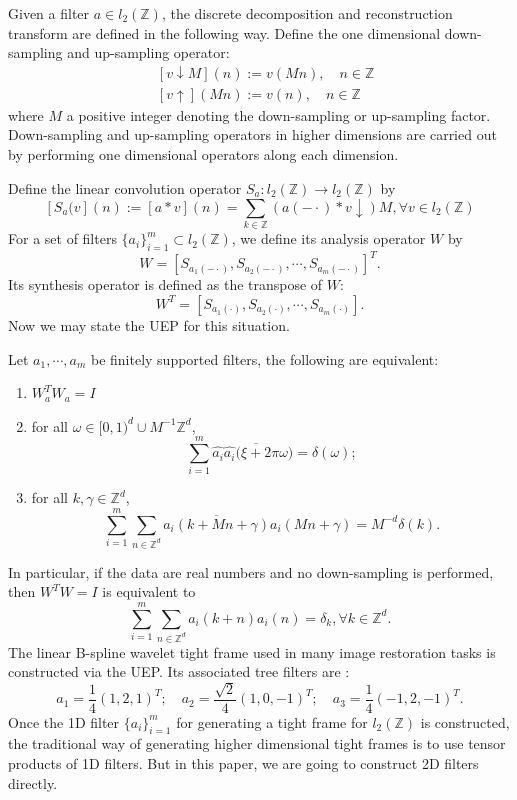 \documentclass[a4paper]{article}
\begin{document}
Given a filter $a\in l_2(\mathbb{Z})$, the discrete decomposition and reconstruction transform are defined in the following way. Define the one dimensional down-sampling and up-sampling operator:
\[
	\begin{aligned}
		&[v\downarrow M](n):=v(Mn),\quad n\in \mathbb{Z}\\
		&[v\uparrow](Mn):=v(n), \quad n\in \mathbb{Z}
	\end{aligned}
\]
where $M$ a positive integer denoting the down-sampling or up-sampling factor. Down-sampling and up-sampling operators in higher dimensions are carried out by performing one dimensional operators along each dimension. 

Define the linear convolution operator $S_a: l_2(\mathbb{Z}) \rightarrow l_2(\mathbb{Z})$ by 
\[
[S_a(v](n):=[a*v](n)=\sum_{k\in\mathbb{Z}} (a(-\cdot)*v \downarrow)M, \forall v\in l_2(\mathbb{Z})
\]
For a set of filters $\{a_i\}_{i=1}^m\subset l_2(\mathbb{Z})$, we define its analysis operator $W$ by 
\[
	W=[S_{a_1(-\cdot)},S_{a_2(-\cdot)},\cdots,S_{a_m(-\cdot)}]^T.
\]
Its synthesis operator is defined as the transpose of $W$:
\[
	W^T=[S_{a_1(\cdot)},S_{a_2(\cdot)},\cdots, S_{a_m(\cdot )}].
\]
Now we may state the UEP for this situation.
\begin{prop}[cite]
Let $a_1,\cdots,a_m$ be finitely supported filters, the following are equivalent:
\begin{enumerate}
\item $W_a^T W_a = I$
\item for all $\omega \in [0,1)^d\cup M^{-1}\mathbb{Z}^d$,
	\[
		\sum_{i=1}^m \hat{a_i}\overline{\hat{a_i}(\xi + 2\pi\omega})=\delta(\omega);
	\]
\item for  all $k,\gamma \in \mathbb{Z}^d$,
	\[
		\sum_{i=1}^m \sum_{n\in\mathbb{Z}^d} \overline{a_i(k+Mn+\gamma)}a_i(Mn+\gamma)=M^{-d}\delta(k).
	\]
\end{enumerate}
\end{prop}
In particular, if the data are real numbers and no down-sampling is performed, then $W^TW=I$ is equivalent to 
\begin{equation}
\label{eq:uep}
	\sum_{i=1}^m \sum_{n\in \mathbb{Z}^d} a_i(k+n) a_i(n)=\delta_k, \forall k\in \mathbb{Z}^d.
\end{equation}
The linear B-spline wavelet tight frame used in many image restoration tasks is constructed via the UEP. Its associated tree filters are :
\[
	a_1=\frac{1}{4}(1,2,1)^T; \quad a_2=\frac{\sqrt{2}}{4}(1,0,-1)^T; \quad a_3=\frac{1}{4}(-1,2,-1)^T.
\]
Once the 1D filter $\{a_i\}_{i=1}^m$ for generating a tight frame for $l_2(\mathbb{Z})$ is constructed, the traditional way of generating higher dimensional tight frames is to use tensor products of 1D filters. But in this paper, we are going to construct 2D filters directly.
\end{document}
